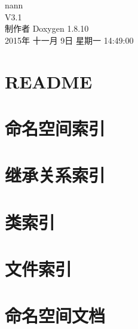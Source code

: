 \documentclass[twoside]{book}
\newcommand{\+}{\discretionary{\mbox{\scriptsize$\hookleftarrow$}}{}{}}
\newcommand{\clearemptydoublepage}{%
  \newpage{\pagestyle{empty}\cleardoublepage}%
}
\begin{document}
\hypersetup{pageanchor=false,
             bookmarks=true,
             bookmarksnumbered=true,
             pdfencoding=unicode
            }
\begin{titlepage}
\vspace*{7cm}
\begin{center}%
{\Large nann \\[1ex]\large V3.\+1 }\\
\vspace*{1cm}
{\large 制作者 Doxygen 1.8.10}\\
\vspace*{0.5cm}
{\small 2015年 十一月 9日 星期一 14:49:00}\\
\end{center}
\end{titlepage}
\clearemptydoublepage
\tableofcontents
\clearemptydoublepage
{}
\hypersetup{pageanchor=true}

\chapter{R\+E\+A\+D\+M\+E}
\label{md__r_e_a_d_m_e}
\hypertarget{md__r_e_a_d_m_e}{}

\chapter{命名空间索引}

\chapter{继承关系索引}

\chapter{类索引}

\chapter{文件索引}

\chapter{命名空间文档}



\end{document}
